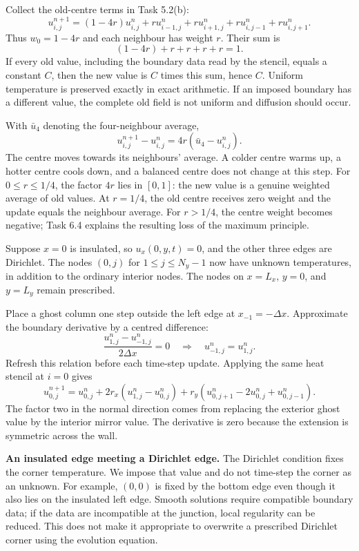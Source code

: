 Collect the old-centre terms in Task 5.2(b):
\[
\boxed{u^{n+1}_{i,j}=(1-4r)u^n_{i,j}
+r u^n_{i-1,j}+r u^n_{i+1,j}+r u^n_{i,j-1}+r u^n_{i,j+1}.}
\]
Thus $w_0=1-4r$ and each neighbour has weight $r$.
Their sum is
\[
(1-4r)+r+r+r+r=1.
\]
If every old value, including the boundary data read by the stencil, equals a constant $C$,
then the new value is $C$ times this sum, hence $C$. Uniform temperature is preserved exactly
in exact arithmetic. If an imposed boundary has a different value, the complete old field is
not uniform and diffusion should occur.

With $\bar u_4$ denoting the four-neighbour average,
\[
u^{n+1}_{i,j}-u^n_{i,j}=4r(\bar u_4-u^n_{i,j}).
\]
The centre moves towards its neighbours' average. A colder centre warms up, a hotter centre
cools down, and a balanced centre does not change at this step. For $0\le r\le1/4$, the
factor $4r$ lies in $[0,1]$: the new value is a genuine weighted average of old values.
At $r=1/4$, the old centre receives zero weight and the update equals the neighbour average.
For $r>1/4$, the centre weight becomes negative; Task 6.4 explains the resulting loss of
the maximum principle.

Suppose $x=0$ is insulated, so $u_x(0,y,t)=0$, and the other three edges are Dirichlet.
The nodes $(0,j)$ for $1\le j\le N_y-1$ now have unknown temperatures, in addition to the
ordinary interior nodes. The nodes on $x=L_x$, $y=0$, and $y=L_y$ remain prescribed.

Place a ghost column one step outside the left edge at $x_{-1}=-\Delta x$.
Approximate the boundary derivative by a centred difference:
\[
\frac{u^n_{1,j}-u^n_{-1,j}}{2\Delta x}=0
\quad\Longrightarrow\quad
\boxed{u^n_{-1,j}=u^n_{1,j}.}
\]
Refresh this relation before each time-step update. Applying the same heat stencil at $i=0$ gives
\[
\boxed{u^{n+1}_{0,j}=u^n_{0,j}
+2r_x(u^n_{1,j}-u^n_{0,j})
+r_y(u^n_{0,j+1}-2u^n_{0,j}+u^n_{0,j-1}).}
\]
The factor two in the normal direction comes from replacing the exterior ghost value by the
interior mirror value. The derivative is zero because the extension is symmetric across the wall.

\textbf{An insulated edge meeting a Dirichlet edge.}
The Dirichlet condition fixes the corner temperature. We impose that value and do not time-step
the corner as an unknown. For example, $(0,0)$ is fixed by the bottom edge even though it also
lies on the insulated left edge. Smooth solutions require compatible boundary data; if the data
are incompatible at the junction, local regularity can be reduced. This does not make it
appropriate to overwrite a prescribed Dirichlet corner using the evolution equation.

